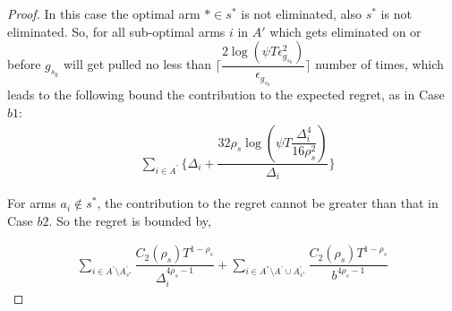 \begin{proof}
In this case the optimal arm ${*}\in s^{*}$ is not eliminated, also $s^{*}$ is not eliminated. So, for all sub-optimal arms $i$ in $A'$ which gets eliminated on or before $g_{s_{k}}$ will get pulled no less than $\bigg\lceil\dfrac{2\log{(\psi T\epsilon_{g_{s_{k}}}^{2})}}{\epsilon_{g_{s_{k}}}}\bigg\rceil$ number of times, which leads to the following bound the contribution to the expected regret, as in Case $b1$:
% 
\begin{align*}
 &\sum_{i\in A^{'}}\bigg\lbrace \Delta_{i}+\dfrac{32\rho_{s}\log{(\psi T\dfrac{\Delta_{i}^{4}}{16\rho_{s}^{2}})}}{\Delta_{i}} \bigg\rbrace 
\end{align*} 

For arms $a_i \notin s^*$, the contribution to the regret cannot be greater than that in Case $b2$. So the regret is bounded by,

\begin{align*}
\sum_{i\in A^{'}\setminus A_{s^*}^{'}}\dfrac{C_{2}(\rho_{s})T^{1-\rho_{s}}}{\Delta_{i}^{4\rho_{s}-1}} +\sum_{i\in A^{''}\setminus A^{'} \cup A_{s^*}^{'}}\dfrac{C_{2}(\rho_{s})T^{1-\rho_{s}}}{b^{4\rho_{s}-1}}
\end{align*}

% 
% 
 

\end{proof}
